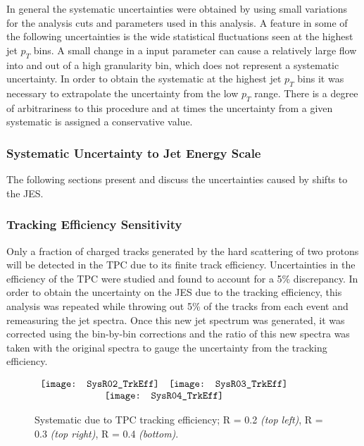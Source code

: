 In general the systematic uncertainties were obtained by using small variations for the analysis cuts and parameters used in this analysis.  A feature in some of the following uncertainties is the wide statistical fluctuations seen at the highest jet $p_{T}$ bins.  A small change in a input parameter can cause a relatively large flow into and out of a high granularity bin, which does not represent a systematic uncertainty.  In order to obtain the systematic at the highest jet $p_{T}$ bins it was necessary to extrapolate the uncertainty from the low $p_{T}$ range.  There is a degree of arbitrariness to this procedure and at times the uncertainty from a given systematic is assigned a conservative value.  

\subsubsection{Systematic Uncertainty to Jet Energy Scale}

The following sections present and discuss the uncertainties caused by shifts to the JES. 

\subsubsection{Tracking Efficiency Sensitivity}
Only a fraction of charged tracks generated by the hard scattering of two protons will be detected in the TPC due to its finite track efficiency.  Uncertainties in the efficiency of the TPC were studied and found to account for a 5\% discrepancy\cite{Abelev:2013ala}.  In order to obtain the uncertainty on the JES due to the tracking efficiency, this analysis was repeated while throwing out 5\% of the tracks from each event and remeasuring the jet spectra.  Once this new jet spectrum was generated, it was corrected using the bin-by-bin corrections and the ratio of this new spectra was taken with the original spectra to gauge the uncertainty from the tracking efficiency.


\begin{figure*}[t!]
$\begin{array}{rl}
    \texttt{[image: SysR02\_TrkEff]} &
    \texttt{[image: SysR03\_TrkEff]}\\
    \multicolumn{2}{c}{\texttt{[image: SysR04\_TrkEff]}}
\end{array}$
\caption[Systematic due to TPC tracking efficiency.]{\label{fig:trkeff}Systematic due to TPC tracking efficiency; R = 0.2 \textit{(top left)}, R = 0.3 \textit{(top right)}, R = 0.4 \textit{(bottom)}.}
\end{figure*}

